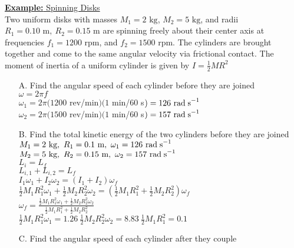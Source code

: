 \documentclass[a4paper]{article}
\let\bf\textbf
\newcommand\rads{\text{ rad\;s}^{-1}}
\newcommand\m{\text{ m}}
\newcommand\kg{\text{ kg}}
\begin{document}
\begin{shaded}
    \underline{\bf{Example:} Spinning Disks}
    \vspace{2mm}\\
    Two uniform disks with masses $M_1 = 2\kg$, $M_2 = 5\kg$, and radii $R_1 = 0.10\m,\ R_2 = 0.15\m$ are spinning freely about their center axis at frequencies $f_1 = 1200$ rpm, and $f_2 = 1500$ rpm. The cylinders are brought together and come to the same angular velocity via frictional contact. The moment of inertia of a uniform cylinder is given by $I = \frac{1}{2}MR^2$
    \begin{enumerate}
        \item[A.] Find the angular speed of each cylinder before they are joined\\
        $\omega = 2\pi f$\\
        $\omega_1 = 2\pi(1200$ rev/min$)(1$ min/60 s$) = 126\rads$\\
        $\omega_2 = 2\pi(1500$ rev/min$)(1$ min/60 s$) = 157\rads$
        \item[B.] Find the total kinetic energy of the two cylinders before they are joined\\
        $M_1 = 2\kg,\ R_1 = 0.1\m,\ \omega_1 = 126\rads$ $M_2 = 5\kg,\ R_2 = 0.15\m,\ \omega_2 = 157\rads$\\
        $L_i = L_f$\\
        $L_{i,1} + L_{i,2} = L_f$\\
        $I_1\omega_1 + I_2\omega_2 = (I_1 + I_2)\omega_f$\\
        $\frac{1}{2}M_1R_1^2\omega_1 + \frac{1}{2}M_2R_2^2\omega_2 = (\frac{1}{2}M_1R_1^2 + \frac{1}{2}M_2R_2^2)\omega_f$\\
        $\omega_f = \frac{\frac{1}{2}M_1R_1^2\omega_1 + \frac{1}{2}M_2R_2^2\omega_2}{\frac{1}{2}M_1R_1^2 + \frac{1}{2}M_2R_2^2}$\\
        $\frac{1}{2}M_1R_1^2\omega_1 = 1.26\ \frac{1}{2}M_2R_2^2\omega_2 = 8.83\ \frac{1}{2}M_1R_1^2 = 0.1$
        \item[C.] Find the angular speed of each cylinder after they couple
    \end{enumerate}
\end{shaded}
\end{document}
